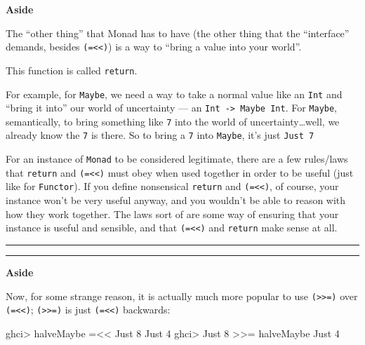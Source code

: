 \documentclass[]{article}
\newenvironment{Shaded}{}{}
\newcommand{\DataTypeTok}[1]{\textcolor[rgb]{0.56,0.13,0.00}{{#1}}}
\newcommand{\DecValTok}[1]{\textcolor[rgb]{0.25,0.63,0.44}{{#1}}}
\newcommand{\FunctionTok}[1]{\textcolor[rgb]{0.02,0.16,0.49}{{#1}}}
\newcommand{\NormalTok}[1]{{#1}}
\begin{document}
\textbf{Aside}

The ``other thing'' that Monad has to have (the other thing that the
``interface'' demands, besides \texttt{(=\textless{}\textless{})}) is a
way to ``bring a value into your world''.

This function is called \texttt{return}.

For example, for \texttt{Maybe}, we need a way to take a normal value
like an \texttt{Int} and ``bring it into'' our world of uncertainty ---
an \texttt{Int\ -\textgreater{}\ Maybe\ Int}. For \texttt{Maybe},
semantically, to bring something like \texttt{7} into the world of
uncertainty\ldots{}well, we already know the \texttt{7} is there. So to
bring a \texttt{7} into \texttt{Maybe}, it's just \texttt{Just\ 7}

For an instance of \texttt{Monad} to be considered legitimate, there are
a few rules/laws that \texttt{return} and
\texttt{(=\textless{}\textless{})} must obey when used together in order
to be useful (just like for \texttt{Functor}). If you define nonsensical
\texttt{return} and \texttt{(=\textless{}\textless{})}, of course, your
instance won't be very useful anyway, and you wouldn't be able to reason
with how they work together. The laws sort of are some way of ensuring
that your instance is useful and sensible, and that
\texttt{(=\textless{}\textless{})} and \texttt{return} make sense at
all.

\begin{center}\rule{0.5\linewidth}{\linethickness}\end{center}

\begin{center}\rule{0.5\linewidth}{\linethickness}\end{center}

\textbf{Aside}

Now, for some strange reason, it is actually much more popular to use
\texttt{(\textgreater{}\textgreater{}=)} over
\texttt{(=\textless{}\textless{})};
\texttt{(\textgreater{}\textgreater{}=)} is just
\texttt{(=\textless{}\textless{})} backwards:

\begin{Shaded}
\begin{Highlighting}[]
\NormalTok{ghci}\FunctionTok{>} \NormalTok{halveMaybe }\FunctionTok{=<<} \DataTypeTok{Just} \DecValTok{8}
\DataTypeTok{Just} \DecValTok{4}
\NormalTok{ghci}\FunctionTok{>} \DataTypeTok{Just} \DecValTok{8} \FunctionTok{>>=} \NormalTok{halveMaybe}
\DataTypeTok{Just} \DecValTok{4}
\end{Highlighting}
\end{Shaded}
\end{document}
